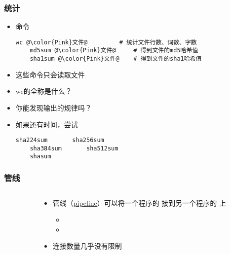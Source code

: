 \begin{CJK}{UTF8}{gbsn}
\begin{frame} [fragile]
	\frametitle{统计}
	\linespread{1.25}
	\begin{itemize}
	\item 命令
	\begin{lstlisting}[style=bashstyle, gobble=4, texcl, escapechar=@]
	wc @\color{Pink}文件@			# 统计文件行数、词数、字数
	md5sum @\color{Pink}文件@		# 得到文件的md5哈希值
	sha1sum @\color{Pink}文件@	# 得到文件的sha1哈希值
	\end{lstlisting}
	\item 这些命令只会读取文件
	\item wc的全称是什么？
	\item 你能发现输出的规律吗？
	\item 如果还有时间，尝试 
	\begin{lstlisting}[style=bashstyle, gobble=4, texcl, escapechar=@]
	sha224sum		sha256sum
	sha384sum		sha512sum
	shasum
	\end{lstlisting}
	\end{itemize}
\end{frame}

\begin{frame} [fragile]
	\frametitle{管线}
	\linespread{1.5}
	\begin{columns}[T]
		\begin{column}[T]{.5\textwidth}
			
		\end{column}
		\begin{column}[T]{.5\textwidth}
			\begin{itemize}
			\item 管线（\href{https://en.wikipedia.org/wiki/Pipeline\_(Unix)}
							{pipeline}）可以将一个程序的 
							接到另一个程序的  上
				\begin{itemize}
				\item {}
				\item {}
				\end{itemize}
			\item 连接数量几乎没有限制
			\end{itemize}
		\end{column}
	\end{columns}
\end{frame}


\end{CJK}
